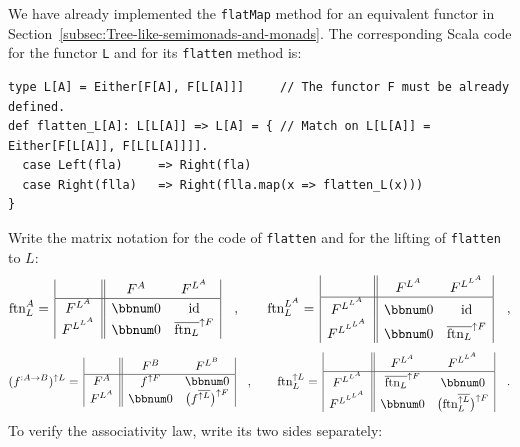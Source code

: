 We have already implemented the \lstinline!flatMap! method for an
equivalent functor in Section~\ref{subsec:Tree-like-semimonads-and-monads}.
The corresponding Scala code for the functor \lstinline!L! and for
its \lstinline!flatten! method is:
\begin{lstlisting}
type L[A] = Either[F[A], F[L[A]]]     // The functor F must be already defined.
def flatten_L[A]: L[L[A]] => L[A] = { // Match on L[L[A]] = Either[F[L[A]], F[L[L[A]]]].
  case Left(fla)     => Right(fla)
  case Right(flla)   => Right(flla.map(x => flatten_L(x)))
}
\end{lstlisting}
Write the matrix notation for the code of \lstinline!flatten! and
for the lifting of \lstinline!flatten! to $L$:
\[
\text{ftn}_{L}^{A}=\,\begin{array}{|c||cc|}
 & F^{A} & F^{L^{A}}\\
\hline F^{L^{A}} & \bbnum 0 & \text{id}\\
F^{L^{L^{A}}} & \bbnum 0 & \overline{\text{ftn}_{L}}^{\uparrow F}
\end{array}\quad,\quad\quad\text{ftn}_{L}^{L^{A}}=\,\begin{array}{|c||cc|}
 & F^{L^{A}} & F^{L^{L^{A}}}\\
\hline F^{L^{L^{A}}} & \bbnum 0 & \text{id}\\
F^{L^{L^{L^{A}}}} & \bbnum 0 & \overline{\text{ftn}_{L}}^{\uparrow F}
\end{array}\quad,
\]
\[
(f^{:A\rightarrow B})^{\uparrow L}=\,\begin{array}{|c||cc|}
 & F^{B} & F^{L^{B}}\\
\hline F^{A} & f^{\uparrow F} & \bbnum 0\\
F^{L^{A}} & \bbnum 0 & \big(f^{\overline{\uparrow L}}\big)^{\uparrow F}
\end{array}\quad,\quad\quad\text{ftn}_{L}^{\uparrow L}=\,\begin{array}{|c||cc|}
 & F^{L^{A}} & F^{L^{L^{A}}}\\
\hline F^{L^{L^{A}}} & \overline{\text{ftn}_{L}}^{\uparrow F} & \bbnum 0\\
F^{L^{L^{L^{A}}}} & \bbnum 0 & \big(\text{ftn}_{L}^{\overline{\uparrow L}}\big)^{\uparrow F}
\end{array}\quad.
\]
To verify the associativity law, write its two sides separately:
